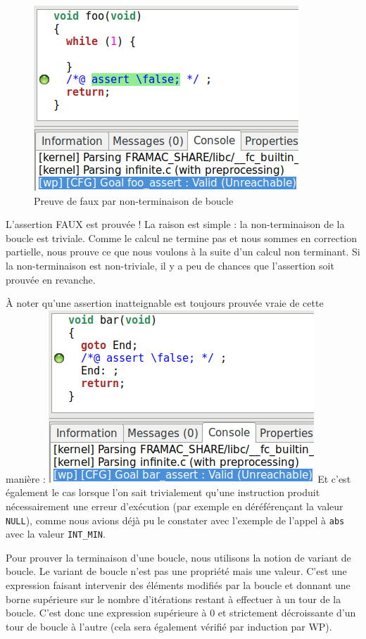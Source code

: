 \documentclass[12pt,francais,]{scrbook}
\newenvironment{zdsblock}[1]{%
  \tcolorbox[beamer,%
    noparskip,breakable,
    colback=LightBlue,colframe=DarkBlue,%
    colbacklower=DarkBlue,%
    title=#1]
}{\endtcolorbox}
\begin{document}
\begin{figure}[htbp]
\centering
\includegraphics[scale=0.5]{3-3-infinite.png}
\caption{Preuve de faux par non-terminaison de boucle}
\label{fig:3-3-infini}
\end{figure}

L'assertion \og{}FAUX\fg{} est prouvée ! La raison est simple : la
non-terminaison de la boucle est triviale. Comme le calcul ne termine
pas et nous sommes en correction partielle, nous prouve ce que nous
voulons à la suite d'un calcul non terminant. Si la non-terminaison est
non-triviale, il y a peu de chances que l'assertion soit prouvée en
revanche.

\begin{zdsblock}{Information}
  À noter qu'une assertion
  inatteignable est toujours prouvée vraie de cette manière :
  \includegraphics[scale=0.5]{3-3-goto_end.png}
  Et c'est également le cas lorsque l'on sait
  trivialement qu'une instruction produit nécessairement une
  erreur d'exécution (par exemple en déréférençant la valeur
  \texttt{NULL}), comme nous avions déjà pu le constater avec l'exemple
  de l'appel à \texttt{abs} avec la valeur \texttt{INT\_MIN}.
\end{zdsblock}

Pour prouver la terminaison d'une boucle, nous utilisons la notion de
variant de boucle. Le variant de boucle n'est pas une propriété mais une
valeur. C'est une expression faisant intervenir des éléments modifiés
par la boucle et donnant une borne supérieure sur le nombre d'itérations
restant à effectuer à un tour de la boucle. C'est donc une expression
supérieure à 0 et strictement décroissante d'un tour de boucle à l'autre
(cela sera également vérifié par induction par WP).
\end{document}
